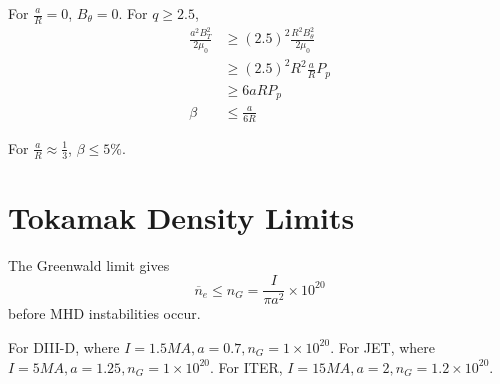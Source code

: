 \documentclass[12pt]{article}
\begin{document}
For $\frac{a}{R} = 0$, $B_\theta = 0$. For $q \geq 2.5$,
\begin{align*}
    \frac{a^2B_T^2}{2\mu_0} &\geq (2.5)^2\frac{R^2B_\theta^2}{2\mu_0} \\
                            &\geq (2.5)^2R^2 \frac{a}{R} P_p \\
                            &\geq 6aRP_p \\
    \beta &\leq \frac{a}{6R}
\end{align*}

For $\frac{a}{R} \approx \frac{1}{3}$, $\beta \leq 5\%$.

\section{Tokamak Density Limits}

The Greenwald limit gives
$$\overline n_e \leq n_G = \frac{I}{\pi a^2} \times 10^{20}$$
before MHD instabilities occur.

\begin{ex}
    For DIII-D, where $I = 1.5 \unit{MA}, a = 0.7, n_G = 1 \times 10^{20}$. For JET, where $I = 5\unit{MA}, a = 1.25, n_G = 1 \times 10^{20}$. For ITER, $I = 15\unit{MA}, a = 2, n_G = 1.2 \times 10^{20}$.
\end{ex}
\end{document}
